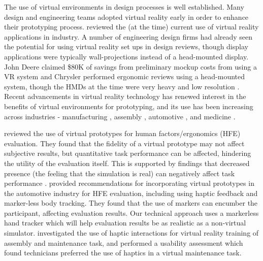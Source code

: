 The use of virtual environments in design processes is well established.
Many design and engineering teams adopted virtual reality early in order to enhance their prototyping process.
\citet{brooks_jr_whats_1999} reviewed the (at the time) current use of virtual reality applications in industry.
A number of engineering design firms had already seen the potential for using virtual reality set ups in design reviews, though display applications were typically wall-projections instead of a head-mounted display.
John Deere claimed \$80K of savings from preliminary mockup costs from using a VR system and Chrysler performed ergonomic reviews using a head-mounted system, though the HMDs at the time were very heavy and low resolution \citep{brooks_jr_whats_1999}.
Recent advancements in virtual reality technology has renewed interest in the benefits of virtual environments for prototyping, and its use has been increasing across industries - manufacturing \citep{choi_virtual_2015}, assembly \citep{pontonnier_designing_2014}, automotive \citep{bordegoni_mixed_2012,lawson_future_2016}, and medicine \citep{nagendran_virtual_2013}.

\citet{aromaa_suitability_2016} reviewed the use of virtual prototypes for human factors/ergonomics (HFE) evaluation.
They found that the fidelity of a virtual prototype may not affect subjective results, but quantitative task performance can be affected, hindering the utility of the evaluation itself.
This is supported by findings that decreased presence (the feeling that the simulation is real) can negatively affect task performance \citep{youngblut_relationship_2003}.
\citet{lawson_future_2016} provided recommendations for incorporating virtual prototypes in the automotive industry for HFE evaluation, including using haptic feedback and marker-less body tracking.
They found that the use of markers can encumber the participant, affecting evaluation results.
Our technical approach uses a markerless hand tracker which will help evaluation results be as realistic as a non-virtual simulator.
\citet{abate_haptic-based_2009} investigated the use of haptic interactions for virtual reality training of assembly and maintenance task, and performed a usability assessment which found technicians preferred the use of haptics in a virtual maintenance task.

